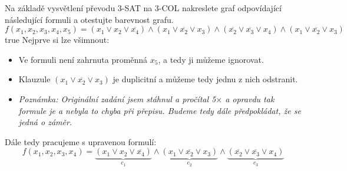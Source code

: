 \documentclass[10pt, a4paper]{ReportSheet}
\begin{document}
    \begin{uloha}{14}{2}{
        Na základě vysvětlení převodu 3-SAT na 3-COL nakreslete graf odpovídající následující formuli a otestujte barevnost grafu.
        \begin{equation*}
            f(x_1, x_2, x_3, x_4, x_5) = (x_1 \lor x_2 \lor \overline{x_4}) \land (x_1 \lor \overline{x_2} \lor x_3) \land (\overline{x_2}
            \lor \overline{x_3} \lor x_4) \land (x_1 \lor \overline{x_2} \lor x_3)
        \end{equation*}
    }{true}
        Nejprve si lze všimnout:
        \begin{itemize}
            \item Ve formuli není zahrnuta proměnná $x_5$, a tedy ji můžeme ignorovat.
            \item Klauzule $(x_1 \lor \overline{x_2} \lor x_3)$ je duplicitní a můžeme tedy jednu z nich odstranit.
            \item \textit{Poznámka: Originální zadání jsem stáhnul a pročítal 5$\times$ a opravdu tak formule je a
            nebyla to chyba při přepisu. Budeme tedy dále předpokládat, že se jedná o záměr.}
        \end{itemize}

        Dále tedy pracujeme s upravenou formulí:
        \begin{equation*}
            f(x_1, x_2, x_3, x_4) =
            \underbrace{(x_1 \lor x_2 \lor \overline{x_4})}_{c_1} \land
            \underbrace{(x_1 \lor \overline{x_2} \lor x_3)}_{c_2} \land
            \underbrace{(\overline{x_2} \lor \overline{x_3} \lor x_4)}_{c_3}
        \end{equation*}


\end{uloha}
\end{document}
